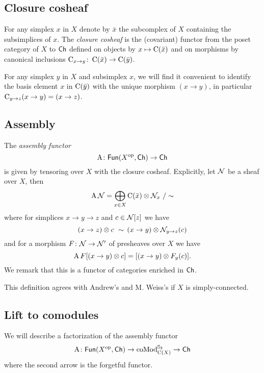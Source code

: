 \subsection{Closure cosheaf}

For any simplex $x$ in $X$ denote by $\bar x$ the subcomplex of $X$ containing the subsimplices of $x$.
The \textit{closure cosheaf} is the (covariant) functor from the poset category of $X$ to $\mathsf{Ch}$ defined on objects by $x \mapsto \operatorname{C}(\bar x)$ and on morphisms by canonical inclusions $\operatorname{C}_{x \to y} \colon \operatorname{C}(\bar x) \to \operatorname{C}(\bar y)$.

For any simplex $y$ in $X$ and subsimplex $x$, we will find it convenient to identify the basis element $x$ in $\operatorname{C}(\bar y)$ with the unique morphism $(x \to y)$, in particular $\operatorname{C}_{y \to z} (x \to y) = (x \to z)$.

\subsection{Assembly} \label{ss:assembly}

The \textit{assembly functor}
\[
\operatorname{A} \colon \mathsf{Fun}(X^{\mathrm{op}}, \mathsf{Ch}) \to \mathsf{Ch}
\]
is given by tensoring over $X$ with the closure cosheaf.
Explicitly, let $\mathcal{N}$ be a sheaf over $X$, then
\[
\operatorname{A} \mathcal{N} = \bigoplus_{x \in X} \operatorname{C}(\bar x) \otimes \mathcal{N}_x \ / \sim
\]
where for simplices $x \to y \to z$ and $c \in \mathcal{N}[z]$ we have
\[
(x \to z) \otimes c \ \sim \, (x \to y) \otimes \mathcal{N}_{y \to z}(c)
\]
and for a morphism $F \colon \mathcal{N} \to \mathcal{N}'$ of presheaves over $X$ we have
\[
\operatorname{A} F[(x \to y) \otimes c] = [(x \to y) \otimes F_y(c)].
\]
We remark that this is a functor of categories enriched in $\mathsf{Ch}$.

This definition agrees with Andrew's and M. Weiss's \cite[Definition 1.4]{ranicki1990assembly} if $X$ is simply-connected.

\subsection{Lift to comodules}

We will describe a factorization of the assembly functor
\[
\operatorname{A} \colon \mathsf{Fun}(X^{\mathrm{op}}, \mathsf{Ch}) \to \operatorname{coMod}^{\mathbb{S}_2}_{\operatorname{C}(X)} \to \mathsf{Ch}
\]
where the second arrow is the forgetful functor.

